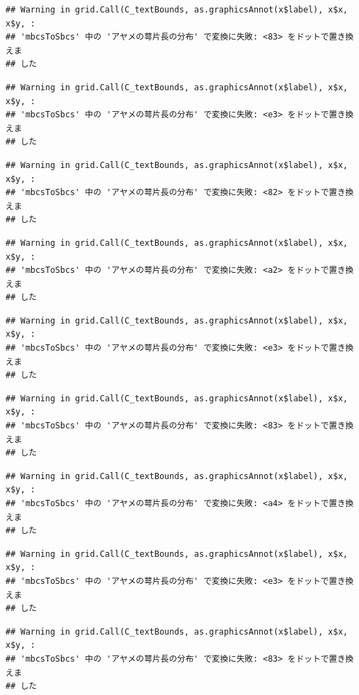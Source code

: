 \documentclass[
]{book}
\begin{document}
\begin{verbatim}
## Warning in grid.Call(C_textBounds, as.graphicsAnnot(x$label), x$x, x$y, :
## 'mbcsToSbcs' 中の 'アヤメの萼片長の分布' で変換に失敗: <83> をドットで置き換えま
## した
\end{verbatim}

\begin{verbatim}
## Warning in grid.Call(C_textBounds, as.graphicsAnnot(x$label), x$x, x$y, :
## 'mbcsToSbcs' 中の 'アヤメの萼片長の分布' で変換に失敗: <e3> をドットで置き換えま
## した
\end{verbatim}

\begin{verbatim}
## Warning in grid.Call(C_textBounds, as.graphicsAnnot(x$label), x$x, x$y, :
## 'mbcsToSbcs' 中の 'アヤメの萼片長の分布' で変換に失敗: <82> をドットで置き換えま
## した
\end{verbatim}

\begin{verbatim}
## Warning in grid.Call(C_textBounds, as.graphicsAnnot(x$label), x$x, x$y, :
## 'mbcsToSbcs' 中の 'アヤメの萼片長の分布' で変換に失敗: <a2> をドットで置き換えま
## した
\end{verbatim}

\begin{verbatim}
## Warning in grid.Call(C_textBounds, as.graphicsAnnot(x$label), x$x, x$y, :
## 'mbcsToSbcs' 中の 'アヤメの萼片長の分布' で変換に失敗: <e3> をドットで置き換えま
## した
\end{verbatim}

\begin{verbatim}
## Warning in grid.Call(C_textBounds, as.graphicsAnnot(x$label), x$x, x$y, :
## 'mbcsToSbcs' 中の 'アヤメの萼片長の分布' で変換に失敗: <83> をドットで置き換えま
## した
\end{verbatim}

\begin{verbatim}
## Warning in grid.Call(C_textBounds, as.graphicsAnnot(x$label), x$x, x$y, :
## 'mbcsToSbcs' 中の 'アヤメの萼片長の分布' で変換に失敗: <a4> をドットで置き換えま
## した
\end{verbatim}

\begin{verbatim}
## Warning in grid.Call(C_textBounds, as.graphicsAnnot(x$label), x$x, x$y, :
## 'mbcsToSbcs' 中の 'アヤメの萼片長の分布' で変換に失敗: <e3> をドットで置き換えま
## した
\end{verbatim}

\begin{verbatim}
## Warning in grid.Call(C_textBounds, as.graphicsAnnot(x$label), x$x, x$y, :
## 'mbcsToSbcs' 中の 'アヤメの萼片長の分布' で変換に失敗: <83> をドットで置き換えま
## した
\end{verbatim}
\end{document}

